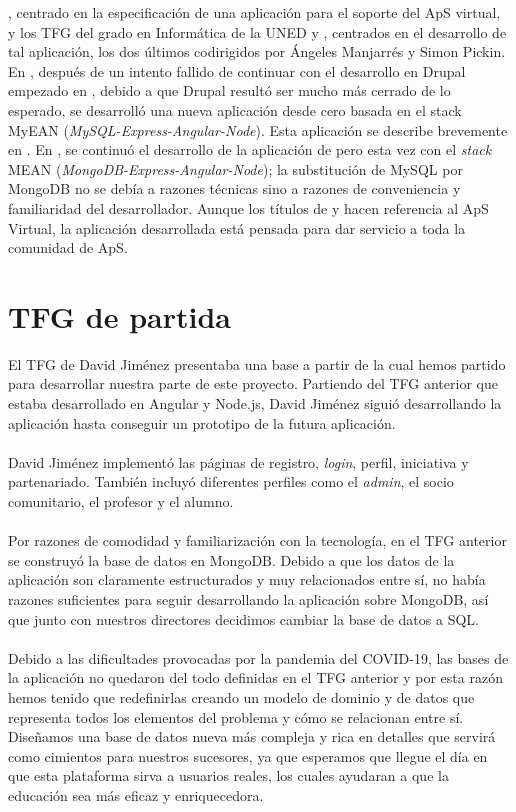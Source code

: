 \documentclass[11pt]{book}
\begin{document}
	\cite{ref3}, centrado en la especificación de una aplicación para el soporte del
	ApS virtual, y los TFG del grado en Informática de la UNED \cite{ref4} y \cite{ref5},
	centrados en el desarrollo de tal aplicación, los dos últimos
	codirigidos por Ángeles Manjarrés y Simon Pickin. En \cite{ref4}, después de un
	intento fallido de continuar con el desarrollo en Drupal empezado en
	\cite{ref3}, debido a que Drupal resultó ser mucho más cerrado de lo esperado,
	se desarrolló una nueva aplicación desde cero basada en el stack MyEAN
	(\emph{MySQL-Express-Angular-Node}). Esta aplicación se describe brevemente en
	\cite{ref6}. En \cite{ref5}, se continuó el desarrollo de la aplicación de \cite{ref4} pero esta
	vez con el \textit{stack} MEAN (\emph{MongoDB-Express-Angular-Node}); la substitución de
	MySQL por MongoDB no se debía a razones técnicas sino a razones de
	conveniencia y familiaridad del desarrollador. Aunque los títulos de \cite{ref4}
	y \cite{ref5} hacen referencia al ApS Virtual, la aplicación desarrollada está
	pensada para dar servicio a toda la comunidad de ApS.	
	\section{TFG de partida}
	El TFG de David Jiménez presentaba una base a partir de la cual hemos partido para desarrollar nuestra parte de este proyecto. Partiendo del TFG anterior que estaba desarrollado en Angular y Node.js, David Jiménez siguió desarrollando la aplicación hasta conseguir un prototipo de la futura aplicación.\\\\
	David Jiménez implementó las páginas de registro, \textit{login}, perfil, iniciativa y partenariado. También incluyó diferentes perfiles como el \textit{admin}, el socio comunitario, el profesor y el alumno.\\\\
	Por razones de comodidad y familiarización con la tecnología, en el TFG anterior se construyó la base de datos en MongoDB. Debido a que los datos de la aplicación son claramente estructurados y muy relacionados entre sí, no había razones suficientes para seguir desarrollando la aplicación sobre MongoDB, así que junto con nuestros directores decidimos cambiar la base de datos a SQL.\\\\
	Debido a las dificultades provocadas por la pandemia del COVID-19, las bases de la aplicación no quedaron del todo definidas en el TFG anterior y por esta razón hemos tenido que redefinirlas creando un modelo de dominio y de datos que representa todos los elementos del problema y cómo se relacionan entre sí. Diseñamos una base de datos nueva más compleja y rica en detalles que servirá como cimientos para nuestros sucesores, ya que esperamos que llegue el día en que esta plataforma sirva a usuarios reales, los cuales ayudaran a que la educación sea más eficaz y enriquecedora.
	
\end{document}
